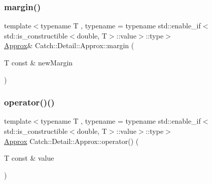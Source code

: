 \mbox{\label{class_catch_1_1_detail_1_1_approx_a6467dc18791e1a1f4c15c4fb63cf5051}} 
\subsubsection{\texorpdfstring{margin()}{margin()}}
{\footnotesize\ttfamily template$<$typename T , typename  = typename std\+::enable\+\_\+if$<$std\+::is\+\_\+constructible$<$double, T$>$\+::value$>$\+::type$>$ \\
\mbox{\hyperlink{class_catch_1_1_detail_1_1_approx}{Approx}}\& Catch\+::\+Detail\+::\+Approx\+::margin (\begin{DoxyParamCaption}\item[{T const \&}]{new\+Margin }\end{DoxyParamCaption})\hspace{0.3cm}{\ttfamily [inline]}}

\mbox{\label{class_catch_1_1_detail_1_1_approx_ad8b2757f4804f9a1d3fa674efb98c20e}} 
\subsubsection{\texorpdfstring{operator()()}{operator()()}}
{\footnotesize\ttfamily template$<$typename T , typename  = typename std\+::enable\+\_\+if$<$std\+::is\+\_\+constructible$<$double, T$>$\+::value$>$\+::type$>$ \\
\mbox{\hyperlink{class_catch_1_1_detail_1_1_approx}{Approx}} Catch\+::\+Detail\+::\+Approx\+::operator() (\begin{DoxyParamCaption}\item[{T const \&}]{value }\end{DoxyParamCaption})\hspace{0.3cm}{\ttfamily [inline]}}

\mbox{\label{class_catch_1_1_detail_1_1_approx_aa9adf5f05e641df770039543d5067d30}} 
